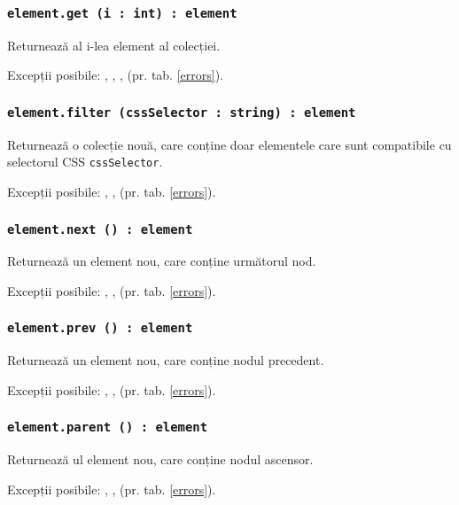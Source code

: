 \subsubsection{\texttt{element.get (i : int) : element}}

Returnează al i-lea element al colecției.

Excepții posibile: , , ,  (pr. tab. \ref{errors}).

\subsubsection{\texttt{element.filter (cssSelector : string) : element}}

Returnează o colecție nouă, care conține doar elementele care sunt compatibile cu selectorul CSS \texttt{cssSelector}.

Excepții posibile: , ,  (pr. tab. \ref{errors}).
\subsubsection{\texttt{element.next () : element}}

Returnează un element nou, care conține următorul nod.

Excepții posibile: , ,  (pr. tab. \ref{errors}).

\subsubsection{\texttt{element.prev () : element}}

Returnează un element nou, care conține nodul precedent.

Excepții posibile: , ,  (pr. tab. \ref{errors}).

\subsubsection{\texttt{element.parent () : element}}

Returnează ul element nou, care conține nodul ascensor.

Excepții posibile: , ,  (pr. tab. \ref{errors}).


